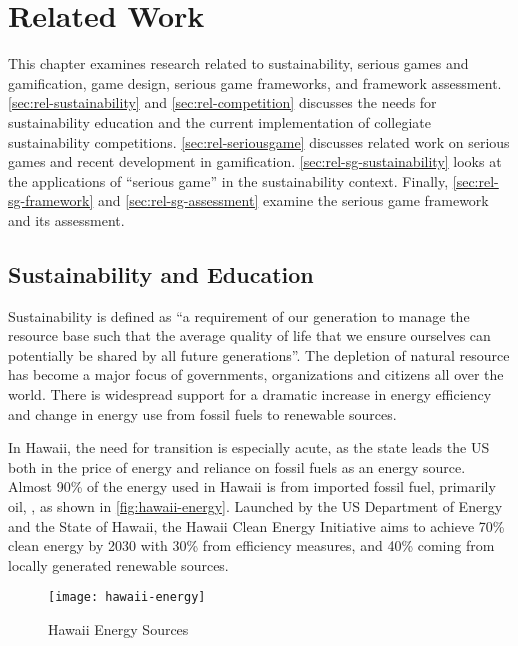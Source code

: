\chapter{Related Work}
\label{cha:related-work}

This chapter examines research related to sustainability, serious games and gamification, game design, serious game frameworks, and framework assessment. \autoref{sec:rel-sustainability} and \autoref{sec:rel-competition} discusses the needs for sustainability education and the current implementation of collegiate sustainability competitions. \autoref{sec:rel-seriousgame} discusses related work on serious games and recent development in gamification. \autoref{sec:rel-sg-sustainability} looks at the applications of ``serious game'' in the sustainability context. Finally, \autoref{sec:rel-sg-framework} and \autoref{sec:rel-sg-assessment} examine the serious game framework and its assessment.

\section{Sustainability and Education}
\label{sec:rel-sustainability}

Sustainability is defined as ``a requirement of our generation to manage the
resource base such that the average quality of life that we ensure ourselves can potentially
be shared by all future generations''\cite{asheim1994sustainability}. The depletion of natural
resource has become a major focus of governments, organizations and citizens all over the world. 
There is widespread support for a dramatic increase in energy efficiency and change in
energy use from fossil fuels to renewable sources\cite{lenssen1996sustainable}. 

In Hawaii, the need for transition is especially acute, as the
state leads the US both in the price of energy and reliance on fossil fuels as an 
energy source. Almost 90\% of the energy used in Hawaii is from imported fossil fuel, primarily oil, \cite{hawaiienergypolicy}, as shown in \autoref{fig:hawaii-energy}. Launched by the US Department of Energy and the State of Hawaii, the Hawaii Clean Energy Initiative \cite{hcei} aims to achieve 70\% clean energy by 2030 with 30\% from efficiency measures, and 40\% coming from locally generated renewable sources.

\begin{figure}[ht!]
	\centering
		\texttt{[image: hawaii-energy]}
		\caption{ Hawaii Energy Sources \cite {hawaiienergypolicy}} 
		\label{fig:hawaii-energy}
\end{figure}

